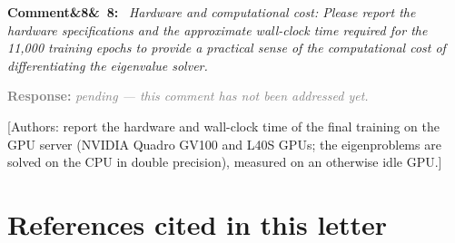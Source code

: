 \documentclass[11pt]{article}
\newenvironment{rcomment}[1]{\par\bigskip\noindent\textbf{Comment\ifx&#1&\else\ #1\fi:}\ \itshape}{\par}
\newcommand{\pending}{\par\smallskip\noindent\textcolor{gray}{\textbf{Response:} \textit{pending --- this comment
has not been addressed yet.}}\par}
\newcommand{\authornote}[1]{\textcolor{note}{\textsf{[Authors: #1]}}}
\begin{document}
\begin{rcomment}{8}
Hardware and computational cost: Please report the hardware specifications and the approximate wall-clock time
required for the 11,000 training epochs to provide a practical sense of the computational cost of differentiating the
eigenvalue solver.
\end{rcomment}
\pending
\authornote{report the hardware and wall-clock time of the final training on the GPU server (NVIDIA Quadro GV100 and L40S GPUs; the eigenproblems are solved on the CPU in double precision), measured on an otherwise idle GPU.}

\section{References cited in this letter}
{\small
\renewcommand{\bibsection}{}
\setlength{\bibsep}{0.3ex}


}
\end{document}
